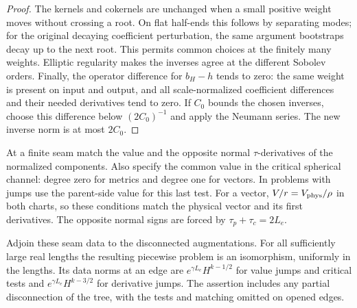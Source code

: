 \begin{proof}
The kernels and cokernels are unchanged when a small positive
weight moves without crossing a root.  On flat half-ends this
follows by separating modes; for the original decaying coefficient
perturbation, the same argument bootstraps decay up to the next
root.  This permits common choices at the finitely many weights.
Elliptic regularity makes the inverses agree at the different
Sobolev orders.  Finally, the operator difference for $b_H-h$
tends to zero: the same weight is present on input and output,
and all scale-normalized coefficient differences and their needed
derivatives tend to zero.  If $C_0$ bounds the chosen inverses,
choose this difference below $(2C_0)^{-1}$ and apply the Neumann
series.  The new inverse norm is at most $2C_0$.
\end{proof}

At a finite seam match the value and the opposite normal
$\tau$-derivatives of the normalized components.  Also specify
the common value in the critical spherical channel: degree zero
for metrics and degree one for vectors.  In problems with jumps
use the parent-side value for this last test.  For a vector,
$V/r=V_{\rm phys}/\rho$ in both charts, so these conditions match
the physical vector and its first derivatives.  The opposite
normal signs are forced by $\tau_p+\tau_c=2L_e$.

\begin{lemma}
\label{ell:seam-inverse}
Adjoin these seam data to the disconnected augmentations.  For all
sufficiently large real lengths the resulting piecewise problem
is an isomorphism, uniformly in the lengths.  Its data norms at
an edge are $e^{\gamma L_e}H^{k-1/2}$ for value jumps and critical
tests and $e^{\gamma L_e}H^{k-3/2}$ for derivative jumps.
The assertion includes any partial disconnection of the tree,
with the tests and matching omitted on opened edges.
\end{lemma}

